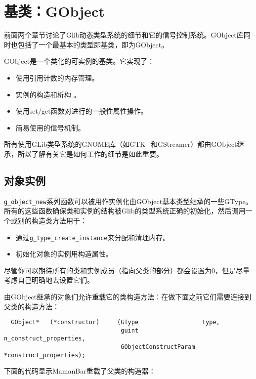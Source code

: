 \chapter{基类：GObject}
前面两个章节讨论了Glib动态类型系统的细节和它的信号控制系统。GObject库同时也包括了一个最基本的类型即基类，即为GObject。

GObject是一个类化的可实例的基类。它实现了：
\begin{itemize}
	\item 使用引用计数的内存管理。
	\item 实例的构造和析构 。
	\item 使用set/get函数对进行的一般性属性操作。
	\item 简易使用的信号机制。
\end{itemize}
所有使用GLib类型系统的GNOME库（如GTK+和GStreamer）都由GObject继承，所以了解有关它是如何工作的细节是如此重要。

\section{对象实例}
\verb|g_object_new|系列函数可以被用作实例化由GObject基本类型继承的一些GType。所有的这些函数确保类和实例的结构被Glib的类型系统正确的初始化，然后调用一个或别的构造类方法用于：

\begin{itemize}
	\item 通过\verb|g_type_create_instance|来分配和清理内存。
	\item 初始化对象的实例用构造属性。
\end{itemize}

尽管你可以期待所有的类和实例成员（指向父类的部分）都会设置为0，但是尽量考虑自己明确地去设置它们。

由GObject继承的对象们允许重载它的类构造方法：在做下面之前它们需要连接到父类的构造方法：
\begin{verbatim}
  GObject*   (*constructor)     (GType                  type,
                                 guint                  n_construct_properties,
                                 GObjectConstructParam *construct_properties);
\end{verbatim}

下面的代码显示MamanBar重载了父类的构造器：

